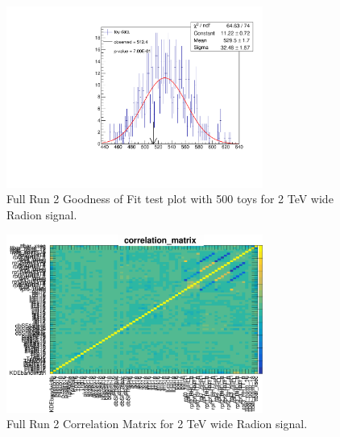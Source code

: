 \begin{figure}[!htb]
	\centering
	\includegraphics[width=0.75\textwidth]{Figures/gof_plot_wide.pdf}
	\caption{Full Run 2 Goodness of Fit test plot with 500 toys for 2 TeV wide Radion signal.}
	\label{fig:gofplotwide}
\end{figure}
\begin{figure}[!htb]
	\centering
	\includegraphics[width=0.75\textwidth]{Figures/correlation_matrix_wide.png}
	\caption{Full Run 2 Correlation Matrix for 2 TeV wide Radion signal.}
	\label{fig:corrMatrixplotwide}
\end{figure}

